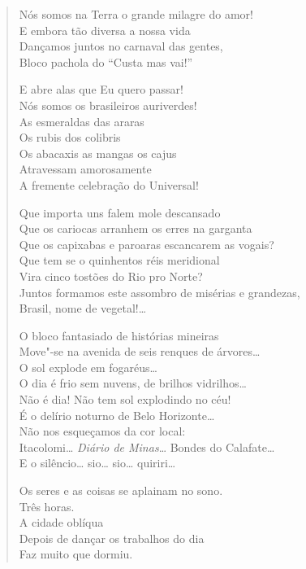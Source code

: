 {\begin{verse}
Nós somos na Terra o grande milagre do amor!\\
E embora tão diversa a nossa vida\\
Dançamos juntos no carnaval das gentes,\\
Bloco pachola do ``Custa mas vai!''

E abre alas que Eu quero passar!\\
Nós somos os brasileiros auriverdes!\\
As esmeraldas das araras\\
Os rubis dos colibris\\
Os abacaxis as mangas os cajus\\
Atravessam amorosamente\\
A fremente celebração do Universal!

Que importa uns falem mole descansado\\
Que os cariocas arranhem os erres na garganta\\
Que os capixabas e paroaras escancarem as vogais?\\
Que tem se o quinhentos réis meridional\\
Vira cinco tostões do Rio pro Norte?\\
Juntos formamos este assombro de misérias e grandezas,\\
Brasil, nome de vegetal!\ldots{}

O bloco fantasiado de histórias mineiras\\
Move"-se na avenida de seis renques de árvores\ldots{}\\
O sol explode em fogaréus\ldots{}\\
O dia é frio sem nuvens, de brilhos vidrilhos\ldots{}\\
Não é dia! Não tem sol explodindo no céu!\\
É o delírio noturno de Belo Horizonte\ldots{}\\
Não nos esqueçamos da cor local:\\
Itacolomi\ldots{} \emph{Diário de Minas}\ldots{} Bondes do Calafate\ldots{}\\
E o silêncio\ldots{} sio\ldots{} sio\ldots{} quiriri\ldots{}

Os seres e as coisas se aplainam no sono.\\
Três horas.\\
A cidade oblíqua\\
Depois de dançar os trabalhos do dia\\
Faz muito que dormiu.


\end{verse}}

